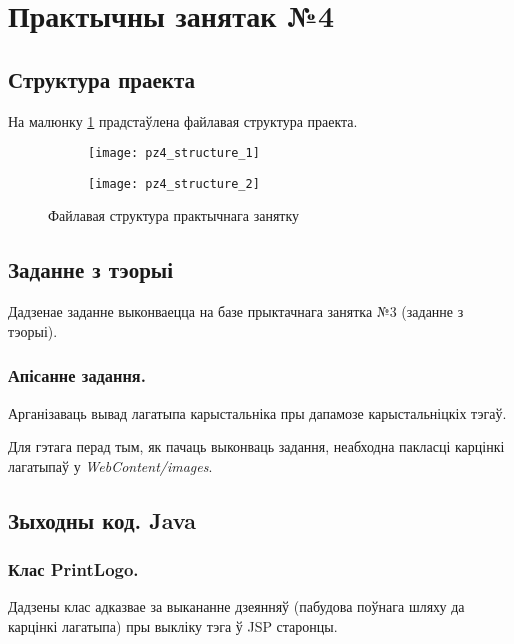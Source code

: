 \section{Практычны занятак №4}

\subsection{Структура праекта}

На малюнку \ref{img: pz4} прадстаўлена файлавая структура праекта.

\begin{figure}[h!]
\centering
\begin{subfigure}{0.5\textwidth}
    \centering
   \texttt{[image: pz4\_structure\_1]}
\end{subfigure}%
\begin{subfigure}{0.5\textwidth}
    \centering
    \texttt{[image: pz4\_structure\_2]}
\end{subfigure}
\caption{Файлавая структура практычнага занятку}
\label{img: pz4} 
\end{figure}

\subsection{Заданне з тэорыі}

Дадзенае заданне выконваецца на базе прыктачнага занятка №3
(заданне з тэорыі).

\subsubsection{Апісанне задання.}

Арганізаваць вывад лагатыпа карыстальніка пры дапамозе карыстальніцкіх
тэгаў.

Для гэтага перад тым, як пачаць выконваць задання, неабходна
пакласці карцінкі лагатыпаў у \textit{WebContent/images}.

\subsection{Зыходны код. Java}

\subsubsection{Клас PrintLogo.}

Дадзены клас адказвае за выкананне дзеянняў (пабудова поўнага шляху
да карцінкі лагатыпа) пры выкліку тэга ў JSP старонцы.

